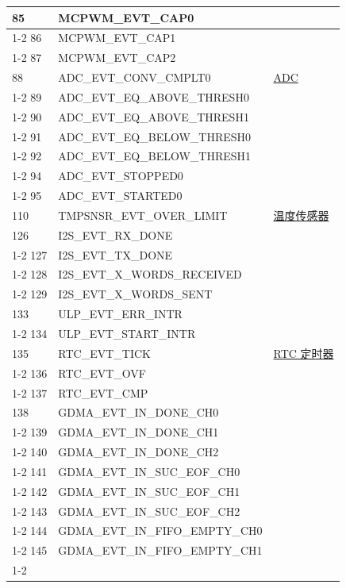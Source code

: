 \documentclass[main\_\_CN.tex]{subfiles}
\begin{document}
\begin{longtable}{ | l | l | l | }
85  & MCPWM\_EVT\_CAP0   & \\ \cline{1-2}
86  & MCPWM\_EVT\_CAP1   & \\ \cline{1-2}
87  & MCPWM\_EVT\_CAP2   & \\ \hline
88  & ADC\_EVT\_CONV\_CMPLT0    & \hyperref[mod:sensor]{ADC}   \\ \cline{1-2}
89  & ADC\_EVT\_EQ\_ABOVE\_THRESH0     & \\ \cline{1-2}
90  & ADC\_EVT\_EQ\_ABOVE\_THRESH1     & \\ \cline{1-2}
91  & ADC\_EVT\_EQ\_BELOW\_THRESH0     & \\ \cline{1-2}
92  & ADC\_EVT\_EQ\_BELOW\_THRESH1     & \\ \cline{1-2}
94  & ADC\_EVT\_STOPPED0 & \\ \cline{1-2}
95  & ADC\_EVT\_STARTED0 & \\ \hline
110 & TMPSNSR\_EVT\_OVER\_LIMIT & \hyperref[mod:sensor]{温度传感器}  \\ \hline
126 & I2S\_EVT\_RX\_DONE & \nameref{mod:i2s}   \\ \cline{1-2}
127 & I2S\_EVT\_TX\_DONE & \\ \cline{1-2}
128 & I2S\_EVT\_X\_WORDS\_RECEIVED     & \\ \cline{1-2}
129 & I2S\_EVT\_X\_WORDS\_SENT  & \\ \hline
133 & ULP\_EVT\_ERR\_INTR  & \nameref{mod:ulp}   \\ \cline{1-2}
134 & ULP\_EVT\_START\_INTR& \\ \hline
135 & RTC\_EVT\_TICK     & \hyperref[mod:lowpowm]{RTC 定时器}   \\ \cline{1-2}
136 & RTC\_EVT\_OVF      & \\ \cline{1-2}
137 & RTC\_EVT\_CMP      & \\ \hline
138 & GDMA\_EVT\_IN\_DONE\_CH0  & \nameref{mod:dma} \\ \cline{1-2}
139 & GDMA\_EVT\_IN\_DONE\_CH1  & \\ \cline{1-2}
140 & GDMA\_EVT\_IN\_DONE\_CH2  & \\ \cline{1-2}
141 & GDMA\_EVT\_IN\_SUC\_EOF\_CH0     & \\ \cline{1-2}
142 & GDMA\_EVT\_IN\_SUC\_EOF\_CH1     & \\ \cline{1-2}
143 & GDMA\_EVT\_IN\_SUC\_EOF\_CH2     & \\ \cline{1-2}
144 & GDMA\_EVT\_IN\_FIFO\_EMPTY\_CH0  & \\ \cline{1-2}
145 & GDMA\_EVT\_IN\_FIFO\_EMPTY\_CH1  & \\ \cline{1-2}

\end{longtable}
\end{document}
